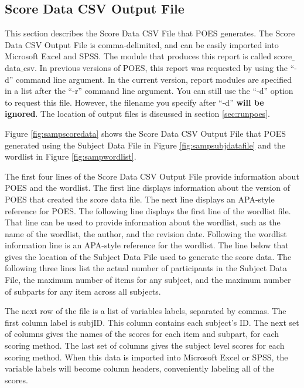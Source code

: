 \documentclass[11pt]{article}
\numberwithin{figure}{section}
\numberwithin{table}{section}
\begin{document}
 
\subsection{Score Data CSV Output File}
\label{sec:scoredataout}

This section describes the Score Data CSV File that POES generates.  The Score Data CSV Output File is comma-delimited, and can be easily imported into Microsoft Excel and SPSS. 
The module that produces this report is called score$\_$data$\_$csv.  In previous versions of POES, this report was requested by using the ``-d'' command line argument.  In the current version, report modules are specified in a list after the ``-r'' command line argument.  You can still use the ``-d'' option to request this file.  However, the filename you specify after ``-d'' \textbf{will be ignored}.  The location of output files is discussed in section \ref{sec:runpoes}.

Figure \ref{fig:sampscoredata} shows the Score Data CSV Output File that POES generated using the Subject Data File in Figure \ref{fig:sampsubjdatafile} and the wordlist in Figure \ref{fig:sampwordlist}.

The first four lines of the Score Data CSV Output File provide information about POES and the wordlist. The first line displays information about the version of POES that created the score data file.  The next line displays an APA-style reference for POES.  The following line displays the first line of the wordlist file.  That line can be used to provide information about the wordlist, such as the name of the wordlist, the author, and the revision date.  Following the wordlist information line is an APA-style reference for the wordlist.  The line below that gives the location of the Subject Data File used to generate the score data.  The following three lines list the actual number of participants in the Subject Data File, the maximum number of items for any subject, and the maximum number of subparts for any item across all subjects.

The next row of the file is a list of variables labels, separated by commas.  The first column label is subjID.  This column contains each subject's ID.  The next set of columns gives the names of the scores for each item and subpart, for each scoring method.  The last set of columns gives the subject level scores for each scoring method.  When this data is imported into Microsoft Excel or SPSS, the variable labels will become column headers, conveniently labeling all of the scores.  
\end{document}
